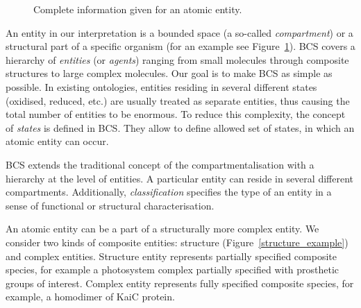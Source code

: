 \documentclass[12pt]{fithesis2}
\begin{document}
\begin{figure}[!h]
\begin{center}
\end{center}
\caption{Complete information given for an atomic entity.}\label{entity_example}
\end{figure}

An entity in our interpretation is a bounded space (a so-called \emph{compartment}) or a structural part of a specific organism (for an example see Figure~\ref{entity_example}). BCS covers a hierarchy of \emph{entities} (or \emph{agents}) ranging from small molecules through composite structures to large complex molecules. Our goal is to make BCS as simple as possible. In existing ontologies, entities residing in several different states (oxidised, reduced, etc.) are usually treated as separate entities, thus causing the total number of entities to be enormous. To reduce this complexity, the concept of \emph{states} is defined in BCS. They allow to define allowed set of states, in which an atomic entity can occur.

BCS extends the traditional concept of the compartmentalisation with a hierarchy at the level of entities. A particular entity can reside in several different compartments. Additionally, \emph{classification} specifies the type of an entity in a sense of functional or structural characterisation.

An atomic entity can be a part of a structurally more complex entity. We consider two kinds of composite entities: structure (Figure~\ref{structure_example}) and complex entities. Structure entity represents partially specified composite species, for example a photosystem complex partially specified with prosthetic groups of interest. Complex entity represents fully specified composite species, for example, a homodimer of KaiC protein.
\end{document}
